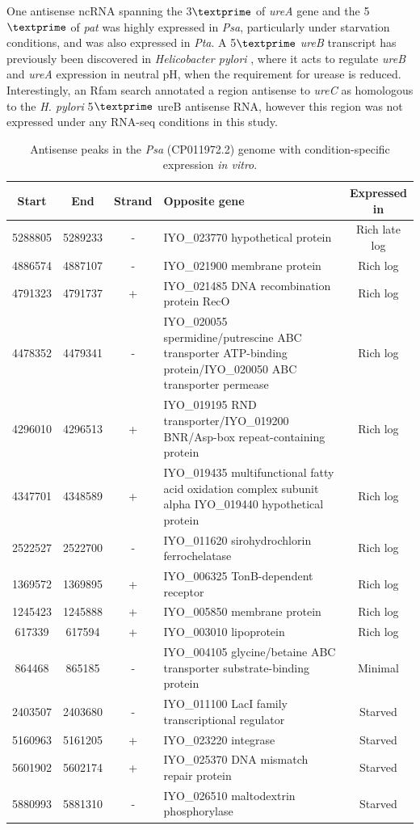 One antisense ncRNA spanning the 3$\textprime$ of \textit{ureA} gene and the 5$\textprime$ of \textit{pat} was highly expressed in \textit{Psa}, particularly under starvation conditions, and was also expressed in \textit{Pta}. A 5$\textprime$ \textit{ureB} transcript has previously been discovered in \textit{Helicobacter pylori} \citep{Wen2011-cd}, where it acts to regulate \textit{ureB} and \textit{ureA} expression in neutral pH, when the requirement for urease is reduced. Interestingly, an Rfam search annotated a region antisense to \textit{ureC} as homologous to the \textit{H. pylori} 5$\textprime$ ureB antisense RNA, however this region was not expressed under any RNA-seq conditions in this study. 
\begin{table}[H]
    \footnotesize
    \centering
\begin{tabular}{cccp{7cm}c}\toprule
Start &  End & Strand & Opposite gene & Expressed in \\\midrule
5288805 & 5289233 & - & IYO_023770	hypothetical protein & Rich late log\\
4886574 & 4887107 & - & IYO_021900	membrane protein & Rich log \\
4791323 & 4791737 & + & IYO_021485	DNA recombination protein RecO & Rich log \\
4478352 & 4479341 & - & IYO_020055	spermidine/putrescine ABC transporter ATP-binding protein/IYO_020050	ABC transporter permease & Rich log\\
4296010 & 4296513 & + & IYO_019195	RND transporter/IYO_019200 BNR/Asp-box repeat-containing protein & Rich log\\
4347701 & 4348589 & + & IYO_019435	multifunctional fatty acid oxidation complex subunit alpha	IYO_019440	hypothetical protein & Rich log\\
2522527 & 2522700 & - &  IYO_011620 sirohydrochlorin ferrochelatase & Rich log\\
1369572 & 1369895 & + & IYO_006325	TonB-dependent receptor	& Rich log\\
1245423 & 1245888 & +	& IYO_005850 membrane protein & Rich log\\
617339 & 617594 &	+ & IYO_003010 lipoprotein	& Rich log\\
864468 & 865185 & - & IYO_004105 glycine/betaine ABC transporter substrate-binding protein & Minimal\\
2403507 & 2403680 & - & IYO_011100 LacI family transcriptional regulator & Starved\\
5160963 & 5161205 & + & IYO_023220 integrase & Starved\\
5601902 & 5602174 & + & IYO_025370 DNA mismatch repair protein & Starved\\
5880993 & 5881310 & - & IYO_026510 maltodextrin phosphorylase & Starved\\
\bottomrule
    \end{tabular}
    \caption{Antisense peaks in the \textit{Psa} (CP011972.2) genome with condition-specific expression \textit{in vitro}.}
    \label{tab:antisense_specific}
\end{table}

